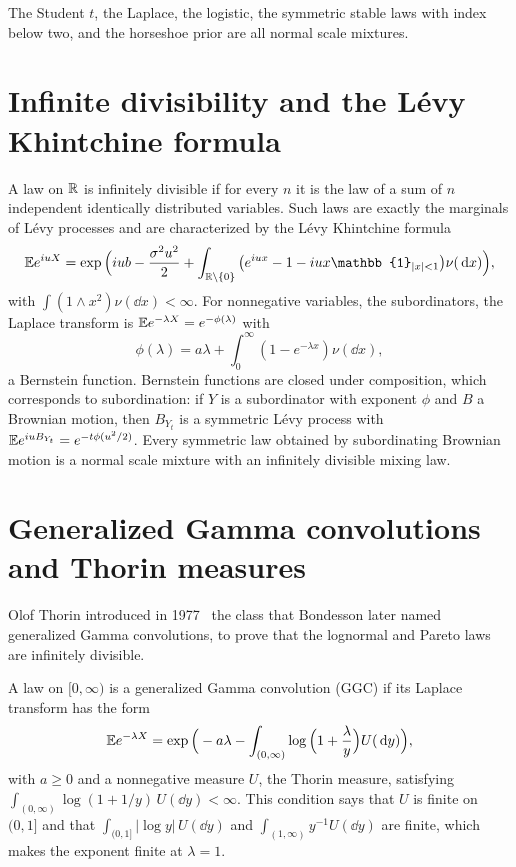The Student $t$, the Laplace, the logistic, the symmetric stable laws with index below two, and the horseshoe prior are all normal scale mixtures.

\section{Infinite divisibility and the L\'evy Khintchine formula}

A law on $\mathbb{R}$ is infinitely divisible if for every $n$ it is the law of a sum of $n$ independent identically distributed variables. Such laws are exactly the marginals of L\'evy processes and are characterized by the L\'evy Khintchine formula
\[
\E e^{iuX} = \exp\Big(iub - \frac{\sigma^2u^2}{2} + \int_{\R\setminus\{0\}}\big(e^{iux} - 1 - iux\mathbb{1}_{|x|<1}\big)\nu(\dd x)\Big),
\]
with $\int(1\wedge x^2)\nu(\dd x)<\infty$. For nonnegative variables, the subordinators, the Laplace transform is $\mathbb{E} e^{-\lambda X} = e^{-\phi(\lambda)}$ with
\[
\phi(\lambda) = a\lambda + \int_0^\infty(1 - e^{-\lambda x})\nu(\dd x),
\]
a Bernstein function. Bernstein functions are closed under composition, which corresponds to subordination: if $Y$ is a subordinator with exponent $\phi$ and $B$ a Brownian motion, then $B_{Y_t}$ is a symmetric L\'evy process with $\mathbb{E} e^{iuB_{Y_t}} = e^{-t\phi(u^2/2)}$. Every symmetric law obtained by subordinating Brownian motion is a normal scale mixture with an infinitely divisible mixing law.

\section{Generalized Gamma convolutions and Thorin measures}

Olof Thorin introduced in 1977~\cite{thorin1977,thorin1977b} the class that Bondesson later named generalized Gamma convolutions, to prove that the lognormal and Pareto laws are infinitely divisible.

\begin{definition}
A law on $[0,\infty)$ is a generalized Gamma convolution (GGC) if its Laplace transform has the form
\[
\mathbb{E} e^{-\lambda X} = \exp\Big(-a\lambda - \int_{(0,\infty)}\log\Big(1+\frac{\lambda}{y}\Big)U(\,\mathrm{d} y)\Big),
\]
with $a\geq0$ and a nonnegative measure $U$, the Thorin measure, satisfying $\int_{(0,\infty)}\log(1+1/y)\,U(\dd y)<\infty$. This condition says that $U$ is finite on $(0,1]$ and that $\int_{(0,1]}|\log y|\,U(\dd y)$ and $\int_{(1,\infty)}y^{-1}U(\dd y)$ are finite, which makes the exponent finite at $\lambda=1$.
\end{definition}

